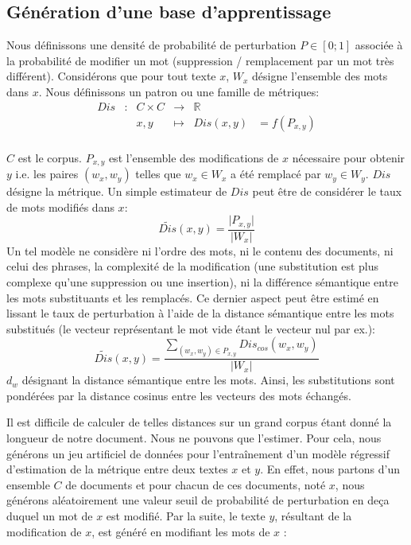 \subsection{Génération d'une base d'apprentissage}
Nous définissons une densité de probabilité de perturbation $P \in [0; 1]$ associée à la probabilité de modifier un mot (suppression / remplacement par un mot très différent). Considérons que pour tout texte $x$, $W_x$ désigne l'ensemble des mots dans $x$.
Nous définissons un patron ou une famille de métriques:
\begin{equation}
\begin{array}{cccccc}
Dis & : & C \times C & \to & \mathbb{R} & \\
 & & x, y & \mapsto & Dis(x, y) & = f(P_{x,y}) \\
\end{array}
\end{equation}

$C$ est le corpus. $P_{x,y}$ est l'ensemble des modifications de $x$ nécessaire pour obtenir $y$ i.e. les paires $(w_x, w_y)$ telles que $w_x \in W_x$ a été remplacé par $w_y \in W_y$. $Dis$ désigne la métrique. Un simple estimateur de $Dis$ peut être de considérer le taux de mots modifiés dans $x$: 
\begin{equation}
\widetilde{Dis}(x,y) = \frac{\vert P_{x,y} \vert }{\vert W_x\vert }
\end{equation}
 Un tel modèle ne considère ni l'ordre des mots, ni le contenu des documents, ni celui des phrases, la complexité de la modification (une substitution est plus complexe qu'une suppression ou une insertion), ni la différence sémantique entre les mots substituants et les remplacés. Ce dernier aspect peut être estimé en lissant le taux de perturbation à l'aide de la distance sémantique entre les mots substitués (le vecteur représentant le mot vide étant le vecteur nul par ex.):
\begin{equation}
\widetilde{Dis}(x,y) = \frac{\sum\limits_{(w_x, w_y) \in P_{x,y}} Dis_{cos}(w_x,w_y)}{\vert W_x\vert} \label{equation:similarite:somme-dist-mots}
\end{equation}
$d_w$ désignant la distance sémantique entre les mots. Ainsi, les substitutions sont pondérées par la distance cosinus entre les vecteurs des mots échangés.

Il est difficile de calculer de telles distances sur un grand corpus étant donné la longueur de notre document. 
Nous ne pouvons que l'estimer. Pour cela, nous générons un jeu artificiel de données pour l'entraînement d'un modèle régressif d'estimation de la métrique entre deux textes $x$ et $y$. En effet, nous partons d'un ensemble $C$ de documents et pour chacun de ces documents, noté $x$, nous générons aléatoirement une valeur seuil de probabilité de perturbation en deça duquel un mot de $x$ est modifié. Par la suite, le texte  $y$, résultant de la modification de $x$, est généré en modifiant les mots de $x$ :

